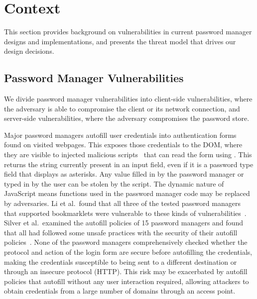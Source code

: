 \section{Context}\label{sec:vulnerabilities}

This section provides background on vulnerabilities in current password manager designs and implementations, and presents the threat model that drives our design decisions.

\subsection{Password Manager Vulnerabilities}

We divide password manager vulnerabilities into client-side vulnerabilities, where the adversary is able to compromise the client or its network connection, and server-side vulnerabilities, where the adversary compromises the password store.

 Major password managers autofill user credentials into authentication forms found on visited webpages. This exposes those credentials to the DOM, where they are visible to injected malicious scripts~\cite{Silver2014,Li2014,Stock2014} that can read the form using . This returns the string currently present in an input field, even if it is a password type field that displays as asterisks. Any value filled in by the password manager or typed in by the user can be stolen by the script.  The dynamic nature of JavaScript means functions used in the password manager code may be replaced by adversaries.  Li et al.\ found that all three of the tested password managers that supported bookmarklets were vulnerable to these kinds of vulnerabilities~\cite{Li2014}. Silver et al.\ examined the autofill policies of 15 password managers and found that all %
had followed some unsafe practices with the security of their autofill policies~\cite{Silver2014}. None of the password managers comprehensively checked whether the protocol and action of the login form are secure before autofilling the credentials, making the credentials susceptible to being sent to a different destination or through an insecure protocol (HTTP). This risk may be exacerbated by autofill policies that autofill without any user interaction required, allowing attackers to obtain credentials from a large number of domains through an access point.


